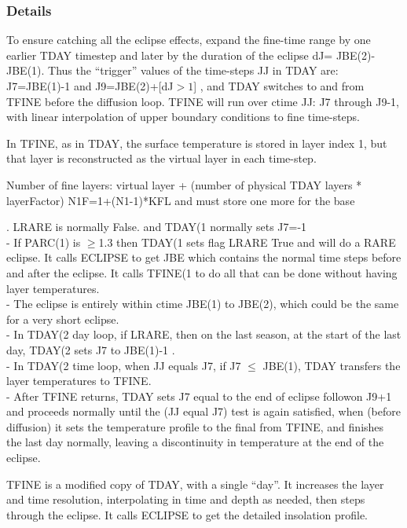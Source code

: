 \documentclass{article}
\begin{document}
\subsubsection{Details} 

To ensure catching all the eclipse effects, expand the fine-time range by one
earlier TDAY timestep and later by the duration of the eclipse dJ=
JBE(2)-JBE(1). Thus the ``trigger'' values of the time-steps JJ in TDAY are:
J7=JBE(1)-1 and J9=JBE(2)+[dJ$>1$] , and TDAY switches to and from TFINE before
the diffusion loop. TFINE will run over ctime JJ: J7 through J9-1, with linear
interpolation of upper boundary conditions to fine time-steps.

In TFINE, as in TDAY, the surface temperature is stored in layer index 1, but
that layer is reconstructed as the virtual layer in each time-step.

Number of fine layers: virtual layer + (number of physical TDAY layers * layerFactor)
\qi  N1F=1+(N1-1)*KFL   and must store one more for the base

. LRARE is normally False. and TDAY(1 normally sets J7=-1
\\ - If PARC(1) is $\geq$1.3 then TDAY(1 sets flag LRARE True and will do a RARE
eclipse. It calls ECLIPSE to get JBE which contains the normal time steps before
and after the eclipse. It calls TFINE(1 to do all that can be done without
having layer temperatures.
\\- The eclipse is entirely within ctime JBE(1) to JBE(2), which could be the same for a very short eclipse.
\\ - In TDAY(2 day loop, if LRARE, then on the last season, at the start of the
last day, TDAY(2 sets J7 to JBE(1)-1 .
\\ - In TDAY(2 time loop, when JJ equals J7, if J7 $\leq$  JBE(1), TDAY transfers
the layer temperatures to TFINE.
\\- After TFINE returns, TDAY sets J7 equal to the end of eclipse followon J9+1
and proceeds normally until the (JJ equal J7) test is again satisfied, when
(before diffusion) it sets the temperature profile to the final from TFINE, and
finishes the last day normally, leaving a discontinuity in temperature at the
end of the eclipse.

TFINE is a modified copy of TDAY, with a single ``day''. It increases the layer
and time resolution, interpolating in time and depth as
needed, then steps through the eclipse. It calls ECLIPSE to get the detailed
insolation profile.
 
\end{document}
